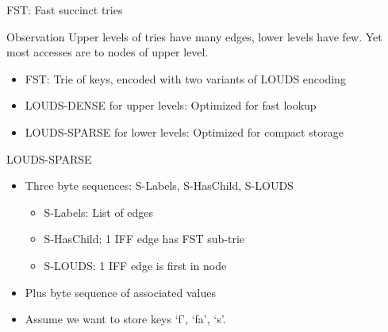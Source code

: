 \documentclass{beamer}
\begin{document}
\begin{frame}{FST: Fast succinct tries}
		\begin{block}{Observation}
						Upper levels of tries have many edges, lower levels
						have few. Yet most accesses are to nodes of upper level.
		\end{block}

		\begin{itemize}
				\item FST: Trie of keys, encoded with two variants of LOUDS encoding
				\item LOUDS-DENSE for upper levels: Optimized for fast lookup
				\item LOUDS-SPARSE  for lower levels: Optimized for compact storage
		\end{itemize}
\end{frame}

\begin{frame}{LOUDS-SPARSE}
		\begin{itemize}
				\item Three byte sequences: S-Labels, S-HasChild, S-LOUDS
						\begin{itemize}
								\item S-Labels: List of edges
								\item S-HasChild: 1 IFF edge has FST sub-trie
								\item S-LOUDS: 1 IFF edge is first in node
						\end{itemize}
				\item Plus byte sequence of associated values
				\item Assume we want to store keys `f', `fa', `s'.
		\end{itemize}
\end{frame}
\end{document}

